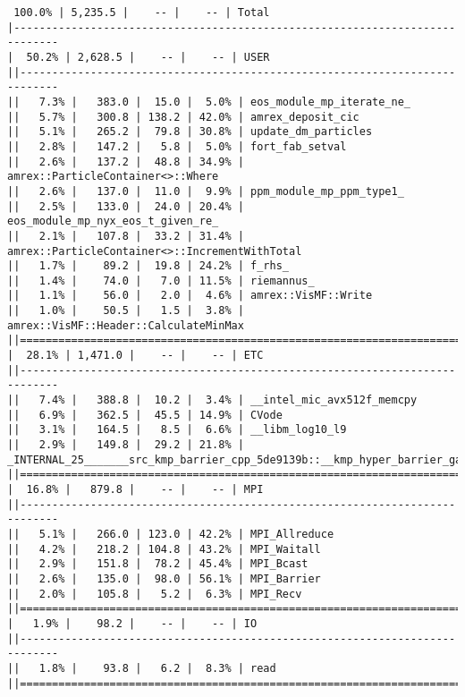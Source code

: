 \begin{enumerate}
\begin{verbatim}
 100.0% | 5,235.5 |    -- |    -- | Total
|-----------------------------------------------------------------------------
|  50.2% | 2,628.5 |    -- |    -- | USER
||----------------------------------------------------------------------------
||   7.3% |   383.0 |  15.0 |  5.0% | eos_module_mp_iterate_ne_
||   5.7% |   300.8 | 138.2 | 42.0% | amrex_deposit_cic
||   5.1% |   265.2 |  79.8 | 30.8% | update_dm_particles
||   2.8% |   147.2 |   5.8 |  5.0% | fort_fab_setval
||   2.6% |   137.2 |  48.8 | 34.9% | amrex::ParticleContainer<>::Where
||   2.6% |   137.0 |  11.0 |  9.9% | ppm_module_mp_ppm_type1_
||   2.5% |   133.0 |  24.0 | 20.4% | eos_module_mp_nyx_eos_t_given_re_
||   2.1% |   107.8 |  33.2 | 31.4% | amrex::ParticleContainer<>::IncrementWithTotal
||   1.7% |    89.2 |  19.8 | 24.2% | f_rhs_
||   1.4% |    74.0 |   7.0 | 11.5% | riemannus_
||   1.1% |    56.0 |   2.0 |  4.6% | amrex::VisMF::Write
||   1.0% |    50.5 |   1.5 |  3.8% | amrex::VisMF::Header::CalculateMinMax
||============================================================================
|  28.1% | 1,471.0 |    -- |    -- | ETC
||----------------------------------------------------------------------------
||   7.4% |   388.8 |  10.2 |  3.4% | __intel_mic_avx512f_memcpy
||   6.9% |   362.5 |  45.5 | 14.9% | CVode
||   3.1% |   164.5 |   8.5 |  6.6% | __libm_log10_l9
||   2.9% |   149.8 |  29.2 | 21.8% | _INTERNAL_25_______src_kmp_barrier_cpp_5de9139b::__kmp_hyper_barrier_gather
||============================================================================
|  16.8% |   879.8 |    -- |    -- | MPI
||----------------------------------------------------------------------------
||   5.1% |   266.0 | 123.0 | 42.2% | MPI_Allreduce
||   4.2% |   218.2 | 104.8 | 43.2% | MPI_Waitall
||   2.9% |   151.8 |  78.2 | 45.4% | MPI_Bcast
||   2.6% |   135.0 |  98.0 | 56.1% | MPI_Barrier
||   2.0% |   105.8 |   5.2 |  6.3% | MPI_Recv
||============================================================================
|   1.9% |    98.2 |    -- |    -- | IO
||----------------------------------------------------------------------------
||   1.8% |    93.8 |   6.2 |  8.3% | read
||============================================================================
\end{verbatim}


\end{enumerate}
